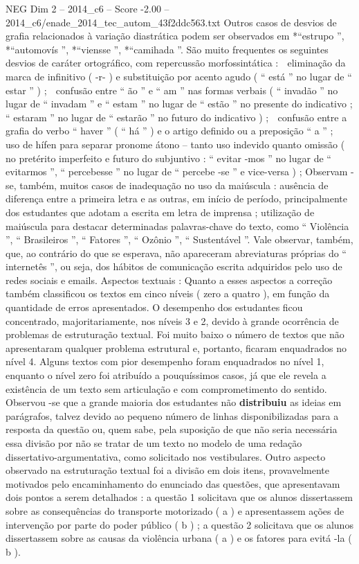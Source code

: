 \begin{textsample}{NEG Dim 2 – 2014\_c6 – Score -2.00 – 2014\_c6/enade\_2014\_tec\_autom\_43f2ddc563.txt}
Outros casos de desvios de grafia relacionados à variação diastrática podem ser observados em *“estrupo ”, *“automovís ”, *“viensse ”, *“camihada ”.
São muito frequentes os seguintes desvios de caráter ortográfico, com repercussão morfossintática :  eliminação da marca de infinitivo ( -r- ) e substituição por acento agudo ( “ está ” no lugar de “ estar ” ) ;  confusão entre “ ão ” e “ am ” nas formas verbais ( “ invadão ” no lugar de “ invadam ” e “ estam ” no lugar de “ estão ” no presente do indicativo ; “ estaram ” no lugar de “ estarão ” no futuro do indicativo ) ;  confusão entre a grafia do verbo “ haver ” ( “ há ” ) e o artigo definido ou a preposição “ a ” ;  uso de hífen para separar pronome átono – tanto uso indevido quanto omissão ( no pretérito imperfeito e futuro do subjuntivo : “ evitar -mos ” no lugar de “ evitarmos ”, “ percebesse ” no lugar de “ percebe -se ” e vice-versa ) ; Observam -se, também, muitos casos de inadequação no uso da maiúscula : ausência de diferença entre a primeira letra e as outras, em início de período, principalmente dos estudantes que adotam a escrita em letra de imprensa ; utilização de maiúscula para destacar determinadas palavras-chave do texto, como “ Violência ”, “ Brasileiros ”, “ Fatores ”, “ Ozônio ”, “ Sustentável ”.
Vale observar, também, que, ao contrário do que se esperava, não apareceram abreviaturas próprias do “ internetês ”, ou seja, dos hábitos de comunicação escrita adquiridos pelo uso de redes sociais e emails.
Aspectos textuais : Quanto a esses aspectos a correção também classificou os textos em cinco níveis ( zero a quatro ), em função da quantidade de erros apresentados.
O desempenho dos estudantes ficou concentrado, majoritariamente, nos níveis 3 e 2, devido à grande ocorrência de problemas de estruturação textual.
Foi muito baixo o número de textos que não apresentaram qualquer problema estrutural e, portanto, ficaram enquadrados no nível 4.
Alguns textos com pior desempenho foram enquadrados no nível 1, enquanto o nível zero foi atribuído a pouquíssimos casos, já que ele revela a existência de um texto sem articulação e com comprometimento do sentido.
Observou -se que a grande maioria dos estudantes não \textbf{distribuiu} as ideias em parágrafos, talvez devido ao pequeno número de linhas disponibilizadas para a resposta da questão ou, quem sabe, pela suposição de que não seria necessária essa divisão por não se tratar de um texto no modelo de uma redação dissertativo-argumentativa, como solicitado nos vestibulares.
Outro aspecto observado na estruturação textual foi a divisão em dois itens, provavelmente motivados pelo encaminhamento do enunciado das questões, que apresentavam dois pontos a serem detalhados : a questão 1 solicitava que os alunos dissertassem sobre as consequências do transporte motorizado ( a ) e apresentassem ações de intervenção por parte do poder público ( b ) ; a questão 2 solicitava que os alunos dissertassem sobre as causas da violência urbana ( a ) e os fatores para evitá -la ( b ).

\end{textsample}

